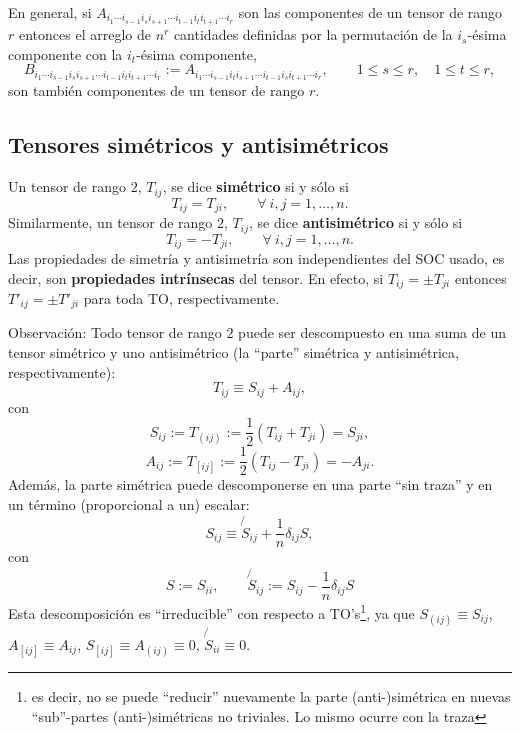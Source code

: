 En general, si $A_{i_1\cdots i_{s-1}i_si_{s+1}\cdots  i_{t-1}i_ti_{t+1}\cdots i_r}$ son las componentes de un tensor de rango $r$ entonces el arreglo de $n^r$ cantidades definidas por la permutación de la $i_s$-ésima componente con la $i_{t}$-ésima componente,
\begin{equation}
B_{i_1\cdots i_{s-1}i_si_{s+1}\cdots  i_{t-1}i_ti_{t+1}\cdots i_r}:=A_{i_1\cdots i_{s-1}i_ti_{s+1}\cdots  i_{t-1}i_si_{t+1}\cdots i_r}, \qquad 1\le s\le r, \quad 1\le t\le r,
\end{equation}
son también componentes de un tensor de rango $r$.

\subsection{Tensores simétricos y antisimétricos}
Un tensor de rango $2$, $T_{ij}$, se dice \textbf{simétrico} si y sólo si
\begin{equation}
T_{ij}=T_{ji}, \qquad \forall\ i,j=1,\dots,n.
\end{equation}
Similarmente, un tensor de rango $2$, $T_{ij}$, se dice \textbf{antisimétrico} si y sólo si
\begin{equation}
T_{ij}=-T_{ji}, \qquad \forall\ i,j=1,\dots,n.
\end{equation}
Las propiedades de simetría y antisimetría son independientes del SOC usado, es decir, son \textbf{propiedades intrínsecas} del tensor. En efecto, si $T_{ij}=\pm T_{ji}$ entonces $T'_{ij}=\pm T'_{ji}$ para toda TO,  respectivamente.

Observación: Todo tensor de rango $2$ puede ser descompuesto en una suma de un tensor simétrico y uno antisimétrico (la ``parte'' simétrica y antisimétrica, respectivamente):
\begin{equation}
T_{ij}\equiv S_{ij}+A_{ij},
\end{equation}
con 
\begin{equation}
S_{ij}:=T_{(ij)}:=\frac{1}{2}\left(T_{ij}+T_{ji}\right)=S_{ji}, 
\end{equation}
\begin{equation}
A_{ij}:=T_{[ij]}:=\frac{1}{2}\left(T_{ij}-T_{ji}\right)=-A_{ji}.
\end{equation}
Además, la parte simétrica puede descomponerse en una parte ``sin traza'' y en un término (proporcional a un) escalar:
\begin{equation}
S_{ij}\equiv \not{\!S}_{ij} +\frac{1}{n}\delta_{ij}S,
\end{equation}
con
\begin{equation}
S:=S_{ii}, \qquad \not{\!S}_{ij}:=S_{ij}- \frac{1}{n}\delta_{ij}S
\end{equation}
Esta descomposición es ``irreducible'' con respecto a TO's\footnote{es decir, no se puede  ``reducir'' nuevamente la parte (anti-)simétrica en nuevas ``sub''-partes (anti-)simétricas no triviales. Lo mismo ocurre con la traza}, ya que $S_{(ij)}\equiv S_{ij}$, $A_{[ij]}\equiv A_{ij}$, $S_{[ij]}\equiv A_{(ij)}\equiv 0$, $\not{\!S}_{ii}\equiv 0$.

